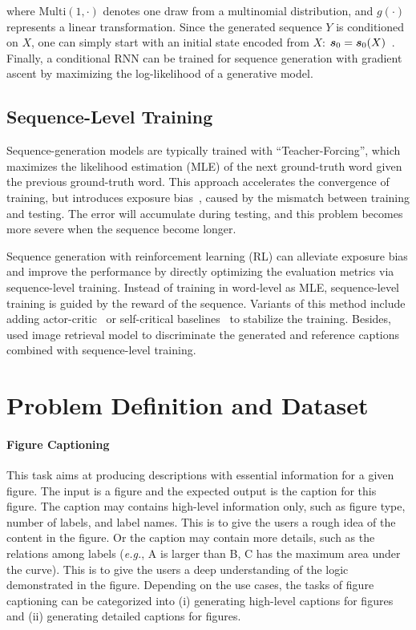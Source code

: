 \documentclass[11pt,a4paper]{article}
\begin{document}
where $\text{Multi}(1,\cdot)$ denotes one draw from a multinomial distribution, and $g(\cdot)$ represents a linear transformation.
Since the generated sequence $Y$ is conditioned on $X$,  one can simply start with an initial state encoded from $X$: ${\boldsymbol s}_0={\boldsymbol s}_0(X)$~\cite{bahdanau2016actor,cho2014learning}. %
Finally, a conditional RNN can be trained for sequence generation with gradient ascent by maximizing the log-likelihood of a generative model.
\subsection{Sequence-Level Training}
Sequence-generation models are typically trained with “Teacher-Forcing”, which maximizes the likelihood estimation (MLE) of the next ground-truth word given the previous ground-truth word. This approach accelerates the convergence of training, but introduces exposure bias~\cite{ranzato2015sequence}, caused by the mismatch between training and testing. The error will accumulate during testing, and this problem becomes more severe when the sequence become longer. 

Sequence generation with reinforcement learning (RL) can alleviate exposure bias and improve the performance by directly optimizing the evaluation metrics via sequence-level training. Instead of training in word-level as MLE, sequence-level training is guided by the reward of the sequence. Variants of this method include adding actor-critic~\cite{bahdanau2016actor} or  self-critical baselines~\cite{rennie2016self,anderson2017bottom} to stabilize the training. Besides,~\cite{luo2018discriminability} used image retrieval model to discriminate the generated and reference captions combined with sequence-level training. 



\section{Problem Definition and Dataset} \label{l:dataset}


\paragraph{Figure Captioning} This task aims at producing descriptions with essential information for a given figure. The input is a figure and the expected output is the caption for this figure. The caption may contains high-level information only, such as figure type, number of labels, and label names. This is to give the users a rough idea of the content in the figure. Or the caption may contain more details, such as the relations among labels (\emph{e.g.}, A is larger than B, C has the maximum area under the curve). This is to give the users a deep understanding of the logic demonstrated in the figure. Depending on the use cases, the tasks of figure captioning can be categorized into (i) generating high-level captions for figures and (ii) generating detailed captions for figures.
\end{document}
